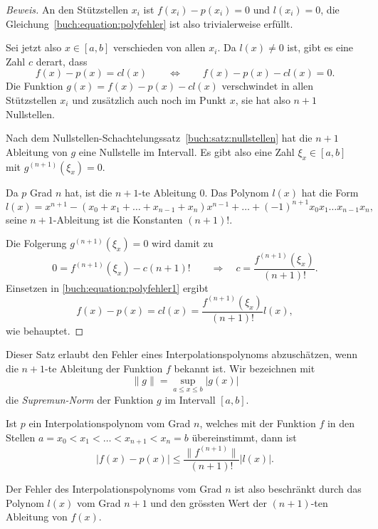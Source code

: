 \begin{proof}[Beweis]
An den Stützstellen $x_i$ ist $f(x_i)-p(x_i)=0$ und $l(x_i)=0$, die
Gleichung~\eqref{buch:equation:polyfehler} ist also trivialerweise
erfüllt.

Sei jetzt also $x\in[a,b]$ verschieden von allen $x_i$.
Da $l(x)\ne 0$ ist, gibt es eine Zahl $c$ derart, dass
\begin{equation}
f(x)-p(x)=cl(x)
\qquad\Leftrightarrow\qquad
f(x)-p(x)-cl(x)=0.
\label{buch:equation:polyfehler1}
\end{equation}
Die Funktion $g(x)=f(x)-p(x)-cl(x)$ verschwindet in allen Stützstellen $x_i$
und zusätzlich auch noch im Punkt $x$, sie hat also $n+1$ Nullstellen.

Nach dem Nullstellen-Schachtelungssatz~\ref{buch:satz:nullstellen}
hat die $n+1$ Ableitung von $g$ eine Nullstelle im Intervall.
Es gibt also eine Zahl $\xi_x\in[a,b]$ mit $g^{(n+1)}(\xi_x)=0$.

Da $p$ Grad $n$ hat, ist die $n+1$-te Ableitung $0$.
Das Polynom $l(x)$ hat die Form
\[
l(x) = x^{n+1} -(x_0+x_1+\dots+x_{n-1}+x_n)x^{n-1} + \dots + (-1)^{n+1}x_0x_1\dots x_{n-1}x_n,
\]
seine $n+1$-Ableitung ist die Konstanten $(n+1)!$.

Die Folgerung $g^{(n+1)}(\xi_x)=0$ wird damit zu
\[
0 = f^{(n+1)}(\xi_x) -c (n+1)!
\qquad\Rightarrow\quad
c=\frac{f^{(n+1)}(\xi_x)}{(n+1)!}.
\]
Einsetzen in \eqref{buch:equation:polyfehler1} ergibt
\[
f(x)-p(x) = cl(x)=\frac{f^{(n+1)}(\xi_x)}{(n+1)!} l(x),
\]
wie behauptet.
\end{proof}

Dieser Satz erlaubt den Fehler eines Interpolationspolynoms abzuschätzen,
wenn die $n+1$-te Ableitung der Funktion $f$ bekannt ist.
Wir bezeichnen mit
\[
\|g\| = \sup_{a\le x\le b} |g(x)|
\]
die {\em Supremun-Norm} der Funktion $g$ im Intervall $[a,b]$.

\begin{korollar}
\label{buch:korollar:interpolationsfehler}
Ist $p$ ein Interpolationspolynom vom Grad $n$, welches mit der Funktion
$f$ in den Stellen $a=x_0<x_1<\dots <x_{n+1}<x_n=b$ übereinstimmt, dann
ist 
\[
|f(x)-p(x)| \le \frac{\|f^{(n+1)}\|}{(n+1)!} |l(x)|.
\]
\end{korollar}

Der Fehler des Interpolationspolynoms vom Grad $n$ ist also beschränkt
durch das Polynom $l(x)$ vom Grad $n+1$ und den grössten Wert der
$(n+1)$-ten Ableitung von $f(x)$.

